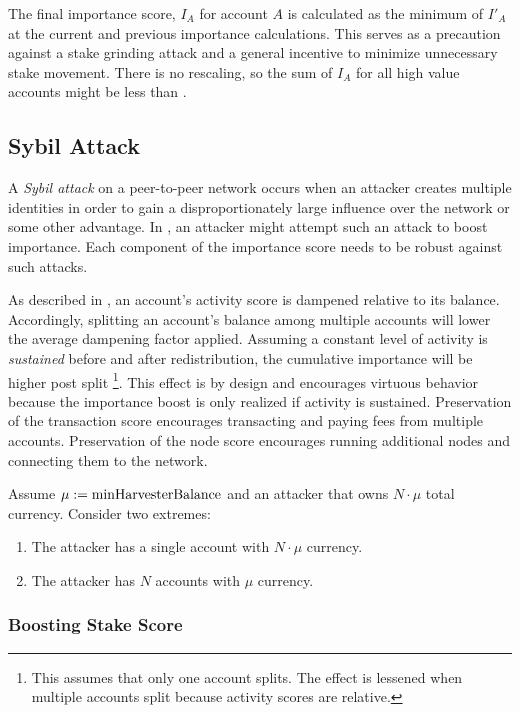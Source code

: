 The final importance score, $I_A$ for account $A$ is calculated as the minimum of $I'_A$ at the current and previous importance calculations.
This serves as a precaution against a stake grinding attack and a general incentive to minimize unnecessary stake movement.
There is no rescaling, so the sum of $I_A$ for all high value accounts might be less than .

\subsection{Sybil Attack}

A \emph{Sybil attack} on a peer-to-peer network occurs when an attacker creates multiple identities in order to gain a disproportionately large influence over the network or some other advantage.
In \codename, an attacker might attempt such an attack to boost importance.
Each component of the importance score needs to be robust against such attacks.

As described in , an account's activity score is dampened relative to its balance.
Accordingly, splitting an account's balance among multiple accounts will lower the average dampening factor applied.
Assuming a constant level of activity is \emph{sustained} before and after redistribution, the cumulative importance will be higher post split
\footnote{
	This assumes that only one account splits.
	The effect is lessened when multiple accounts split because activity scores are relative.
}.
This effect is by design and encourages virtuous behavior because the importance boost is only realized if activity is sustained.
Preservation of the transaction score encourages transacting and paying fees from multiple accounts.
Preservation of the node score encourages running additional nodes and connecting them to the network.

Assume $\mu := \nemsetting{network}{minHarvesterBalance}$ and an attacker that owns $N \cdot \mu$ total currency.
Consider two extremes:

\begin{enumerate}
	\item{The attacker has a single account with $N \cdot \mu$ currency.}
	\item{The attacker has $N$ accounts with $\mu$ currency.}
\end{enumerate}

\subsubsection*{Boosting Stake Score}

